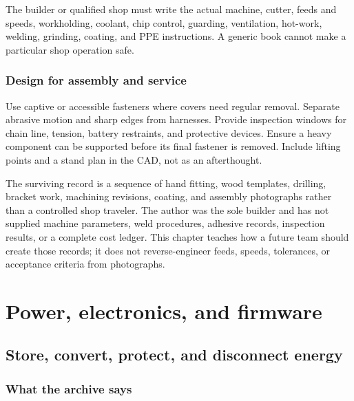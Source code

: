 \documentclass[10pt,openany]{book}
\begin{document}
\begin{safetybox}
The builder or qualified shop must write the actual machine, cutter, feeds and speeds, workholding, coolant, chip control, guarding, ventilation, hot-work, welding, grinding, coating, and PPE instructions. A generic book cannot make a particular shop operation safe.
\end{safetybox}

\section{Design for assembly and service}

Use captive or accessible fasteners where covers need regular removal. Separate abrasive motion and sharp edges from harnesses. Provide inspection windows for chain line, tension, battery restraints, and protective devices. Ensure a heavy component can be supported before its final fastener is removed. Include lifting points and a stand plan in the CAD, not as an afterthought.

\begin{fieldnotebox}[title={HISTORICAL FABRICATION RECORD}]
The surviving record is a sequence of hand fitting, wood templates, drilling, bracket work, machining revisions, coating, and assembly photographs rather than a controlled shop traveler. The author was the sole builder and has not supplied machine parameters, weld procedures, adhesive records, inspection results, or a complete cost ledger. This chapter teaches how a future team should create those records; it does not reverse-engineer feeds, speeds, tolerances, or acceptance criteria from photographs.
\end{fieldnotebox}

\part{Power, electronics, and firmware}


\chapter{Store, convert, protect, and disconnect energy}

\section{What the archive says}
\end{document}
